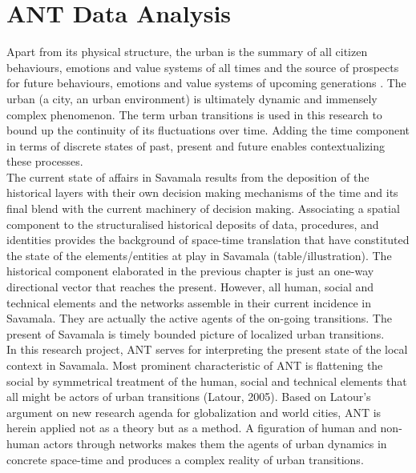 \documentclass[11pt]{report}
\begin{document}


\chapter{ANT Data Analysis}

Apart from its physical structure, the urban is the summary of all citizen behaviours, emotions and value systems of all times and the source of prospects for future behaviours, emotions and value systems of upcoming generations \cite{Stojkov grad kultura politika}.
The urban (a city, an urban environment) is ultimately dynamic and immensely complex phenomenon. The term urban transitions %
is used in this research to bound up the continuity of its fluctuations over time.
Adding the time component in terms of discrete states of past, present and future enables contextualizing these processes. 
\\
The current state of affairs in Savamala results from the deposition of the historical layers with their own decision making mechanisms of the time and its final blend with the current machinery of decision making.
Associating a spatial component to the structuralised historical deposits of data, procedures, and identities provides the background of space-time translation that have constituted the state of the elements/entities at play in Savamala (table/illustration).
The historical component elaborated in the previous chapter is just an one-way directional vector that reaches the present.
However, all human, social and technical elements and the networks assemble in their current incidence in Savamala. They are actually the active agents of the on-going transitions. The present of Savamala is timely bounded picture of localized urban transitions. 
\\
In this research project, ANT serves for interpreting the present state of the local context in Savamala.
Most prominent characteristic of ANT is flattening the social by symmetrical treatment of the human, social and technical elements that all might be actors of urban transitions (Latour, 2005). 
Based on Latour’s argument on new research agenda for globalization and world cities, ANT is herein applied not as a theory but as a method. A figuration of human and non-human actors through networks makes them the agents of urban dynamics in concrete space-time and produces a complex reality of urban transitions. 
\end{document}
